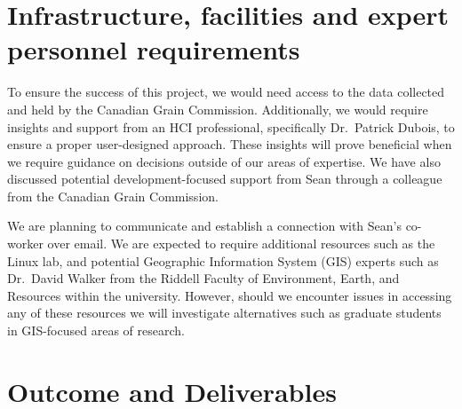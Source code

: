 \documentclass[12pt]{article}
\begin{document}
\section*{Infrastructure, facilities and expert personnel requirements}

To ensure the success of this project, we would need access to the data collected and held by the Canadian Grain Commission. Additionally, we would require insights and support from an HCI professional, specifically Dr.\ Patrick Dubois, to ensure a proper user-designed approach. These insights will prove beneficial when we require guidance on decisions outside of our areas of expertise. We have also discussed potential development-focused support from Sean through a colleague from the Canadian Grain Commission. 

We are planning to communicate and establish a connection with Sean’s co-worker over email. We are expected to require additional resources such as the Linux lab, and potential Geographic Information System (GIS) experts such as Dr.\ David Walker from the Riddell Faculty of Environment, Earth, and Resources within the university. However, should we encounter issues in accessing any of these resources we will investigate alternatives such as graduate students in GIS-focused areas of research.   

\section*{Outcome and Deliverables}
\end{document}
